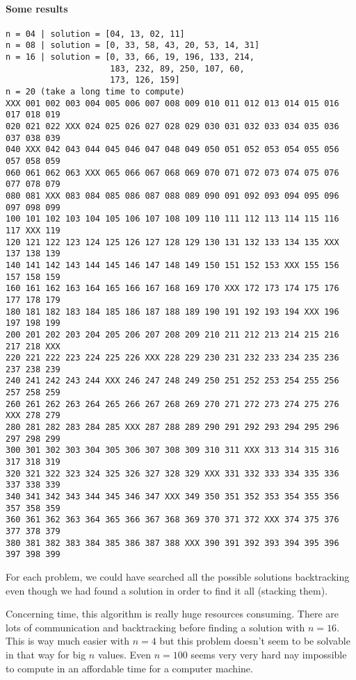 \documentclass[a4paper,11pt]{article}
\begin{document}
  \paragraph{Some results}
\begin{verbatim}
n = 04 | solution = [04, 13, 02, 11]
n = 08 | solution = [0, 33, 58, 43, 20, 53, 14, 31]
n = 16 | solution = [0, 33, 66, 19, 196, 133, 214,
                     183, 232, 89, 250, 107, 60, 
                     173, 126, 159]
n = 20 (take a long time to compute)
XXX 001 002 003 004 005 006 007 008 009 010 011 012 013 014 015 016 017 018 019
020 021 022 XXX 024 025 026 027 028 029 030 031 032 033 034 035 036 037 038 039
040 XXX 042 043 044 045 046 047 048 049 050 051 052 053 054 055 056 057 058 059
060 061 062 063 XXX 065 066 067 068 069 070 071 072 073 074 075 076 077 078 079
080 081 XXX 083 084 085 086 087 088 089 090 091 092 093 094 095 096 097 098 099
100 101 102 103 104 105 106 107 108 109 110 111 112 113 114 115 116 117 XXX 119
120 121 122 123 124 125 126 127 128 129 130 131 132 133 134 135 XXX 137 138 139
140 141 142 143 144 145 146 147 148 149 150 151 152 153 XXX 155 156 157 158 159
160 161 162 163 164 165 166 167 168 169 170 XXX 172 173 174 175 176 177 178 179
180 181 182 183 184 185 186 187 188 189 190 191 192 193 194 XXX 196 197 198 199
200 201 202 203 204 205 206 207 208 209 210 211 212 213 214 215 216 217 218 XXX
220 221 222 223 224 225 226 XXX 228 229 230 231 232 233 234 235 236 237 238 239
240 241 242 243 244 XXX 246 247 248 249 250 251 252 253 254 255 256 257 258 259
260 261 262 263 264 265 266 267 268 269 270 271 272 273 274 275 276 XXX 278 279
280 281 282 283 284 285 XXX 287 288 289 290 291 292 293 294 295 296 297 298 299
300 301 302 303 304 305 306 307 308 309 310 311 XXX 313 314 315 316 317 318 319
320 321 322 323 324 325 326 327 328 329 XXX 331 332 333 334 335 336 337 338 339
340 341 342 343 344 345 346 347 XXX 349 350 351 352 353 354 355 356 357 358 359
360 361 362 363 364 365 366 367 368 369 370 371 372 XXX 374 375 376 377 378 379
380 381 382 383 384 385 386 387 388 XXX 390 391 392 393 394 395 396 397 398 399
\end{verbatim}

For each problem, we could have searched all the possible solutions backtracking even 
though we had found a solution in order to find it all (stacking them).
  
Concerning time, this algorithm is really huge resources consuming. There are lots of 
communication and backtracking before finding a solution with $n = 16$. This is way much 
easier with $n = 4$ but this problem doesn't seem to be solvable in that way for big $n$ 
values. Even $n = 100$ seems very very hard nay impossible to compute in an affordable 
time for a computer machine.
  
\end{document}
